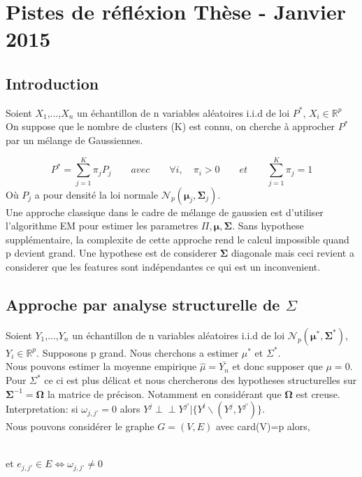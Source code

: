 \documentclass[12pt]{article}
\let\bb\mathbb       %
\def\RR{{\bb R}}\def\ZZ{{\bb Z}}\def\FF{{\bb F}}\def\DD{{\bb D}}
\def\bb{\mathbb}
\def\hat{\widehat}
\def\bSigma{\boldsymbol\Sigma}
\def\bOmega{\boldsymbol\Omega}
\def\bmu{\boldsymbol\mu}
\def\ci{\perp\!\!\!\perp}
\begin{document}
\section{Pistes de réfléxion Thèse - Janvier 2015}
\subsection{Introduction}

Soient $X_1$,...,$X_n$ un échantillon de n variables aléatoires i.i.d de loi $P^*$, $X_i\in\RR^p$
\\
On suppose que le nombre de clusters (K) est connu, on cherche à approcher $P^*$ par un mélange de Gaussiennes.

$$
P^* = \sum_{j=1}^K \pi_jP_j \qquad avec \qquad \forall i, \quad \pi_i>0 \qquad et \qquad \sum_{j=1}^K\pi_j=1
$$
Où $P_j$ a pour densité la loi normale  $\mathcal N_p(\bmu_j,\bSigma_j)$.
\\

Une approche classique dans le cadre de mélange de gaussien est d'utiliser l'algorithme EM pour estimer les parametres $\Pi,\bmu,\bSigma$. Sans hypothese supplémentaire, la complexite de cette approche rend le calcul impossible quand p devient grand. Une hypothese est de considerer $\bSigma$ diagonale mais ceci revient a considerer que les features sont indépendantes ce qui est un inconvenient.

\subsection{Approche par analyse structurelle de $\Sigma$}

Soient $Y_1$,...,$Y_n$ un échantillon de n variables aléatoires i.i.d de loi $\mathcal N_p(\bmu^*,\bSigma^*)$, $Y_i\in\RR^p$. Supposons p grand. Nous cherchons a estimer $\mu^*$ et $\Sigma^*$.
\\
Nous pouvons estimer la moyenne empirique $\hat{\mu}=\bar{Y_n}$ et donc supposer que $\mu=0$. Pour $\Sigma^*$ ce ci est plus délicat et nous chercherons des hypotheses structurelles sur $\bSigma^{-1}=\bOmega$ la matrice de précison. Notamment en considérant que $\bOmega$ est creuse.
Interpretation: si $\omega_{j,j'}=0$ alors $Y^j \ci Y^{j'}|\{Y^l\backslash (Y^j,Y^{j'})\}$.\\
Nous pouvons considérer le graphe $G=(V,E)$ avec card(V)=p alors,

\\
et $e_{j,j'}\in E \iff \omega_{j,j'} \neq 0$
\end{document}

